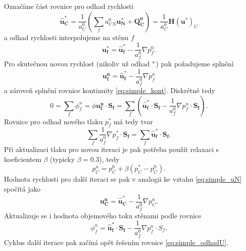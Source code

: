 Označíme část rovnice pro odhad rychlosti
\begin{equation}
\mathbf{\widehat{u}^*_C}= \dfrac{1}{a_C^0} (\sum_f a_{CN}^0 \mathbf{u_N^*}+\mathbf{Q_C^0}) =\dfrac{1}{a_C^0} \mathbf{H}(\mathbf{u^*})_C
\end{equation}
a odhad rychlosti interpolujeme na stěnu $ f $
\begin{equation}
 \mathbf{u_f^*}=\mathbf{\widehat{u}^*_f}-\dfrac{1}{a_f^0}\nabla p_f^0.
\end{equation}
Pro skutečnou novou rychlost (nikoliv už odhad $ \null^* $) pak požadujeme splnění
\begin{equation}\label{eq:simple_uN}
\mathbf{u_f^n}=\mathbf{\widehat{u}^*_f}-\dfrac{1}{a_f^0}\nabla p_f^n
\end{equation}
a zároveň splnění rovnice kontinuity \ref{eq:simple_kont}. Diskrétně tedy
\begin{equation}
0=\sum_f \phi_f^n = \phi \mathbf{u_f^n}\cdot \mathbf{S_f}
=
\sum_f \left(\mathbf{\widehat{u}^*_f}\cdot \mathbf{S_f}-\dfrac{1}{a_f^0}\nabla p_f^n\cdot \mathbf{S_f}\right).
\end{equation}
Rovnice pro odhad nového tlaku $ p_f^* $ má tedy tvar
\begin{equation}
\sum_f\dfrac{1}{a_f^0}\nabla p_f^*\cdot \mathbf{S_f}
=\sum_f \mathbf{\widehat{u}^*_f}\cdot \mathbf{S_f}.
\end{equation}
Při aktualizaci tlaku pro novou iteraci je pak potřeba použít relaxaci s koeficientem $ \beta $ (typicky $ \beta=0.3 $\cite{furst2020mko2}), tedy 
\begin{equation}
p_C^n = p_C^0 + \beta (p_C^*-p_C^0).
\end{equation}
Hodnota rychlosti pro další iteraci se pak v analogii ke vztahu \ref{eq:simple_uN} spočítá jako
\begin{equation}
\mathbf{u_C^n}=\mathbf{\widehat{u}^*_C}-\dfrac{1}{a_f^0}\nabla p_C^n.
\end{equation}
Aktualizuje se i hodnota objemového toku stěnami podle rovnice 
\begin{equation}
\phi_f^n=\mathbf{\widehat{u}^*_f}\cdot \mathbf{S_f}-\dfrac{1}{a_f^0}\nabla p_f^n\cdot S_f.
\end{equation}
Cyklus další iterace pak začíná opět řešením rovnice \ref{eq:simple_odhadU}.

